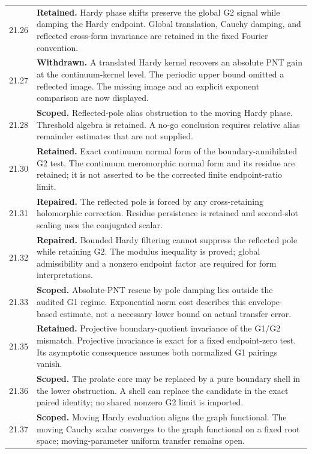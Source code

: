 \documentclass[11pt]{article}
\theoremstyle{remark}
\begin{document}
\begin{longtable}{@{}p{}p{}@{}}
21.26 & \textbf{Retained.} Hardy phase shifts preserve the global G2 signal while damping the Hardy endpoint. Global translation, Cauchy damping, and reflected cross-form invariance are retained in the fixed Fourier convention. \\[4pt]
21.27 & \textbf{Withdrawn.} A translated Hardy kernel recovers an absolute PNT gain at the continuum-kernel level. The periodic upper bound omitted a reflected image. The missing image and an explicit exponent comparison are now displayed. \\[4pt]
21.28 & \textbf{Scoped.} Reflected-pole alias obstruction to the moving Hardy phase. Threshold algebra is retained. A no-go conclusion requires relative alias remainder estimates that are not supplied. \\[4pt]
21.30 & \textbf{Retained.} Exact continuum normal form of the boundary-annihilated G2 test. The continuum meromorphic normal form and its residue are retained; it is not asserted to be the corrected finite endpoint-ratio limit. \\[4pt]
21.31 & \textbf{Repaired.} The reflected pole is forced by any cross-retaining holomorphic correction. Residue persistence is retained and second-slot scaling uses the conjugated scalar. \\[4pt]
21.32 & \textbf{Repaired.} Bounded Hardy filtering cannot suppress the reflected pole while retaining G2. The modulus inequality is proved; global admissibility and a nonzero endpoint factor are required for form interpretations. \\[4pt]
21.33 & \textbf{Scoped.} Absolute-PNT rescue by pole damping lies outside the audited G1 regime. Exponential norm cost describes this envelope-based estimate, not a necessary lower bound on actual transfer error. \\[4pt]
21.35 & \textbf{Retained.} Projective boundary-quotient invariance of the G1/G2 mismatch. Projective invariance is exact for a fixed endpoint-zero test. Its asymptotic consequence assumes both normalized G1 pairings vanish. \\[4pt]
21.36 & \textbf{Scoped.} The prolate core may be replaced by a pure boundary shell in the lower obstruction. A shell can replace the candidate in the exact paired identity; no shared nonzero G2 limit is imported. \\[4pt]
21.37 & \textbf{Scoped.} Moving Hardy evaluation aligns the graph functional. The moving Cauchy scalar converges to the graph functional on a fixed root space; moving-parameter uniform transfer remains open. \\[4pt]

\end{longtable}
\end{document}
